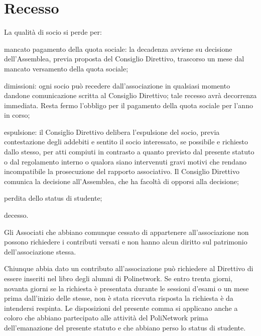 \documentclass[legalpaper, 11pt]{exam}
\let\tempone\enumerate
\let\temptwo\endenumerate
\renewenvironment{enumerate}{\tempone\addtolength{\itemsep}{-0.45\baselineskip}}{\temptwo}
\begin{document}
{\section{Recesso}
\begin{enumerate}
 \item La qualità di socio si perde per:
 \vspace{-5pt}
 \begin{enumerate}
  \item mancato pagamento della quota sociale: la decadenza avviene su decisione dell’Assemblea, previa proposta del Consiglio Direttivo, trascorso un mese dal mancato versamento della quota sociale;
  \item dimissioni: ogni socio può recedere dall’associazione in qualsiasi momento dandone comunicazione scritta al Consiglio Direttivo; tale recesso avrà decorrenza immediata. Resta fermo l’obbligo per il pagamento della quota sociale per l’anno in corso;
  \item espulsione: il Consiglio Direttivo delibera l’espulsione del socio, previa contestazione degli addebiti e sentito il socio interessato, se possibile e richiesto dallo stesso, per atti compiuti in contrasto a quanto previsto dal presente statuto o dal regolamento interno o qualora siano intervenuti gravi motivi che rendano incompatibile la prosecuzione del rapporto associativo. Il Consiglio Direttivo comunica la decisione all’Assemblea, che ha facoltà di opporsi alla decisione;
  \item perdita dello status di studente;
  \item decesso.
 \end{enumerate}

 \item Gli Associati che abbiano comunque cessato di appartenere all’associazione non possono richiedere i contributi versati e non hanno alcun diritto sul patrimonio dell’associazione stessa.
 \item Chiunque abbia dato un contributo all’associazione può richiedere al Direttivo di essere inseriti nel libro degli alumni di Polinetwork. Se entro trenta giorni, novanta giorni se la richiesta è presentata durante le sessioni d’esami o un mese prima dall’inizio delle stesse, non è stata ricevuta risposta la richiesta è da intendersi respinta.
 Le disposizioni del presente comma si applicano anche a coloro che abbiano partecipato alle attività del PoliNetwork prima dell’emanazione del presente statuto e che abbiano perso lo status di studente.
\end{enumerate}




}
\end{document}
